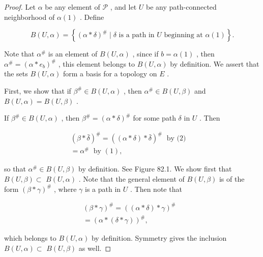 \begin{proof}
Let \(\alpha\) be any element of \(\mathcal{P}\) , and let \(U\) be any path-connected neighborhood of \(\alpha \left( 1\right)\) . Define

\[
B\left( {U,\alpha }\right)  = \left\{  {{\left( \alpha  * \delta \right) }^{\# } \mid  \delta \text{ is a path in }U\text{ beginning at }\alpha \left( 1\right) }\right\}  .
\]

Note that \({\alpha }^{\# }\) is an element of \(B\left( {U,\alpha }\right)\) , since if \(b = \alpha \left( 1\right)\) , then \({\alpha }^{\# } = {\left( \alpha  * {e}_{b}\right) }^{\# }\) , this element belongs to \(B\left( {U,\alpha }\right)\) by definition. We assert that the sets \(B\left( {U,\alpha }\right)\) form a basis for a topology on \(E\) .

First, we show that if \({\beta }^{\# } \in  B\left( {U,\alpha }\right)\) , then \({\alpha }^{\# } \in  B\left( {U,\beta }\right)\) and \(B\left( {U,\alpha }\right)  = B\left( {U,\beta }\right)\) .

If \({\beta }^{\# } \in  B\left( {U,\alpha }\right)\) , then \({\beta }^{\# } = {\left( \alpha  * \delta \right) }^{\# }\) for some path \(\delta\) in \(U\) . Then

\[
\begin{aligned} {\left( \beta  * \bar{\delta }\right) }^{\# } = {\left( \left( \alpha  * \delta \right)  * \bar{\delta }\right) }^{\# }\;\text{ by (2) } &  \\ = {\alpha }^{\# }\;\text{ by }\left( 1\right) , &  \end{aligned}
\]

so that \({\alpha }^{\# } \in  B\left( {U,\beta }\right)\) by definition. See Figure 82.1. We show first that \(B\left( {U,\beta }\right)  \subset\)  \(B\left( {U,\alpha }\right)\) . Note that the general element of \(B\left( {U,\beta }\right)\) is of the form \({\left( \beta  * \gamma \right) }^{\# }\) , where \(\gamma\) is a path in \(U\) . Then note that

\[
\begin{aligned} {\left( \beta  * \gamma \right) }^{\# } = {\left( \left( \alpha  * \delta \right)  * \gamma \right) }^{\# } &  \\ = {\left( \alpha  * \left( \delta  * \gamma \right) \right) }^{\# }, &  \end{aligned}
\]

which belongs to \(B\left( {U,\alpha }\right)\) by definition. Symmetry gives the inclusion \(B\left( {U,\alpha }\right)  \subset\)  \(B\left( {U,\beta }\right)\) as well.


\end{proof}
